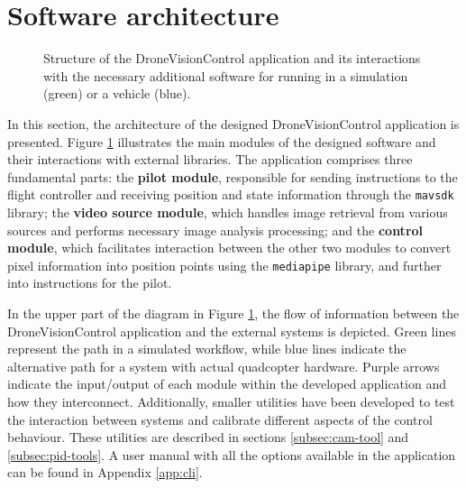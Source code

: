 \section{Software architecture}

\begin{figure}
  \centering
  \caption{Structure of the DroneVisionControl application and its interactions with the necessary additional software for running in a simulation (green) or a vehicle (blue).}
\label{fig:architecture}
\end{figure}

In this section, the architecture of the designed DroneVisionControl application is presented.
Figure \ref{fig:architecture} illustrates the main modules of the designed software and their interactions with external libraries. The application comprises three fundamental parts: the \textbf{pilot module}, responsible for sending instructions to the flight controller and receiving position and state information through the  \texttt{mavsdk} library; the \textbf{video source module}, which handles image retrieval from various sources and performs necessary image analysis processing; and the \textbf{control module}, which facilitates interaction between the other two modules to convert pixel information into position points using the \texttt{mediapipe} library, and further into instructions for the pilot.

In the upper part of the diagram in Figure \ref{fig:architecture}, the flow of information between the DroneVisionControl application and the external systems is depicted. Green lines represent the path in a simulated workflow, while blue lines indicate the alternative path for a system with actual quadcopter hardware. Purple arrows indicate the input/output of each module within the developed application and how they interconnect. Additionally, smaller utilities have been developed to test the interaction between systems and calibrate different aspects of the control behaviour. These utilities are described in sections \ref{subsec:cam-tool} and \ref{subsec:pid-tools}. A user manual with all the options available in the application can be found in Appendix \ref{app:cli}.

